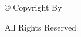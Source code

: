\vspace*{5\baselineskip}

\begin{center}
\copyright
Copyright By {\myname}

{\myday}

All Rights Reserved
\end{center}

